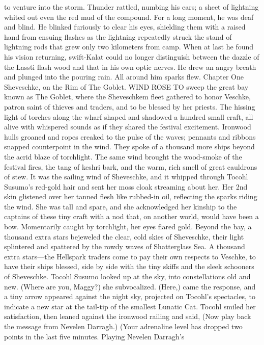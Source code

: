 \documentclass[9pt]{article}
\begin{document}
to venture into the storm. Thunder rattled, numbing his ears; a sheet of lightning whited out even the red
mud of the compound.
For a long moment, he was deaf and blind. He blinked furiously to clear his eyes, shielding them with
a raised hand from ensuing flashes as the lightning repeatedly struck the stand of lightning rods that grew
only two kilometers from camp.
When at last he found his vision returning, swift-Kalat could no longer distinguish between the dazzle
of the Lassti flash wood and that in his own optic nerves. He drew an angry breath and plunged into the
pouring rain. All around him sparks flew.
Chapter One
Sheveschke, on the Rim of The Goblet.
WIND ROSE TO sweep the great bay known as The Goblet, where the Sheveschkem fleet
gathered to honor Veschke, patron saint of thieves and traders, and to be blessed by her priests. The
hissing light of torches along the wharf shaped and shadowed a hundred small craft, all alive with
whispered sounds as if they shared the festival excitement. Ironwood hulls groaned and ropes creaked to
the pulse of the waves; pennants and ribbons snapped counterpoint in the wind. They spoke of a
thousand more ships beyond the acrid blaze of torchlight.
The same wind brought the wood-smoke of the festival fires, the tang of keshri bark, and the warm,
rich smell of great cauldrons of stew.
It was the sailing wind of Sheveschke, and it whipped through Tocohl Susumo’s red-gold hair and
sent her moss cloak streaming about her. Her 2nd skin glistened over her tanned flesh like rubbed-in oil,
reflecting the sparks riding the wind.
She was tall and spare, and she acknowledged her kinship to the captains of these tiny craft with a
nod that, on another world, would have been a bow. Momentarily caught by torchlight, her eyes flared
gold.
Beyond the bay, a thousand extra stars bejeweled the clear, cold skies of Sheveschke, their light
splintered and spattered by the rowdy waves of Shatterglass Sea. A thousand extra stars—the Hellspark
traders come to pay their own respects to Veschke, to have their ships blessed, side by side with the tiny
skiffs and the sleek schooners of Sheveschke.
Tocohl Susumo looked up at the sky, into constellations old and new. (Where are you, Maggy?) she
subvocalized. (Here,) came the response, and a tiny arrow appeared against the night sky, projected on
Tocohl’s spectacles, to indicate a new star at the tail-tip of the smallest Lunatic Cat.
Tocohl smiled her satisfaction, then leaned against the ironwood railing and said, (Now play back the
message from Nevelen Darragh.)
(Your adrenaline level has dropped two points in the last five minutes. Playing Nevelen Darragh’s
\end{document}
